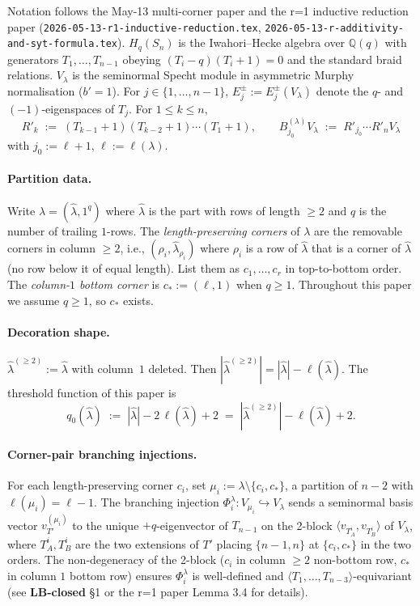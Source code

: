 \documentclass[11pt]{article}
\theoremstyle{definition}
\begin{document}
Notation follows the May-13 multi-corner paper and the r=1 inductive
reduction paper (\texttt{2026-05-13-r1-inductive-reduction.tex},
\texttt{2026-05-13-r-additivity-and-syt-formula.tex}). $H_q(S_n)$ is
the Iwahori--Hecke algebra over $\mathbb{Q}(q)$ with generators
$T_1,\ldots,T_{n-1}$ obeying $(T_i - q)(T_i + 1) = 0$ and the standard
braid relations. $V_\lambda$ is the seminormal Specht module in
asymmetric Murphy normalisation ($b' = 1$). For $j \in \{1, \ldots, n-1\}$,
$E_j^\pm := E_j^\pm(V_\lambda)$ denote the $q$- and $(-1)$-eigenspaces
of $T_j$. For $1 \le k \le n$,
\[
   R'_k \;:=\; (T_{k-1}{+}1)(T_{k-2}{+}1)\cdots(T_1{+}1),
   \qquad
   B^{(\lambda)}_{j_0} V_\lambda \;:=\; R'_{j_0}\cdots R'_n V_\lambda
\]
with $j_0 := \ell + 1$, $\ell := \ell(\lambda)$.

\paragraph{Partition data.} Write $\lambda = (\hat\lambda, 1^q)$
where $\hat\lambda$ is the part with rows of length $\ge 2$ and
$q$ is the number of trailing $1$-rows. The
\emph{length-preserving corners} of $\lambda$ are the removable
corners in column $\ge 2$, i.e., $(\rho_i, \hat\lambda_{\rho_i})$
where $\rho_i$ is a row of $\hat\lambda$ that is a corner of $\hat\lambda$
(no row below it of equal length). List them as $c_1,\ldots,c_r$ in
top-to-bottom order. The \emph{column-$1$ bottom corner} is
$c_* := (\ell, 1)$ when $q \ge 1$. Throughout this paper we assume
$q \ge 1$, so $c_*$ exists.

\paragraph{Decoration shape.}
$\hat\lambda^{(\ge 2)} := \hat\lambda$ with column~$1$ deleted. Then
$|\hat\lambda^{(\ge 2)}| = |\hat\lambda| - \ell(\hat\lambda)$. The
threshold function of this paper is
\begin{equation}\label{eq:threshold}
   q_0(\hat\lambda)
   \;:=\;
   |\hat\lambda| - 2\,\ell(\hat\lambda) + 2
   \;=\;
   |\hat\lambda^{(\ge 2)}| - \ell(\hat\lambda) + 2.
\end{equation}

\paragraph{Corner-pair branching injections.}
For each length-preserving corner $c_i$, set
$\mu_i := \lambda \setminus \{c_i, c_*\}$, a partition of $n - 2$ with
$\ell(\mu_i) = \ell - 1$. The branching injection
$\Phi_i^\lambda : V_{\mu_i} \hookrightarrow V_\lambda$ sends a
seminormal basis vector $v_{T'}^{(\mu_i)}$ to the unique
$+q$-eigenvector of $T_{n-1}$ on the 2-block
$\langle v_{T_A^i}, v_{T_B^i}\rangle$ of $V_\lambda$, where
$T_A^i, T_B^i$ are the two extensions of $T'$ placing $\{n-1, n\}$ at
$\{c_i, c_*\}$ in the two orders. The non-degeneracy of the 2-block
($c_i$ in column $\ge 2$ non-bottom row, $c_*$ in column $1$ bottom
row) ensures $\Phi_i^\lambda$ is well-defined and $\langle T_1, \ldots,
T_{n-3}\rangle$-equivariant (see \textbf{LB-closed} \S 1 or the
r=1 paper Lemma 3.4 for details).
\end{document}
